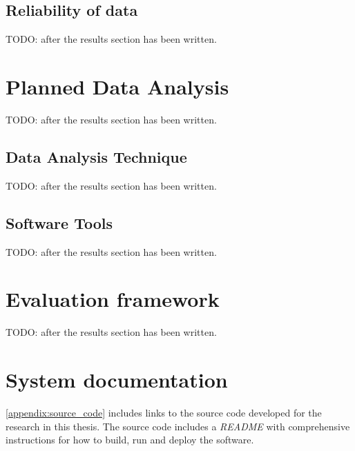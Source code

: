 \subsection{Reliability of data}
\label{sec:reliabilityOfData}






TODO: after the results section has been written.


\section{Planned Data Analysis}
\label{sec:plannedDataAnalysis}




TODO: after the results section has been written.


\subsection{Data Analysis Technique}
\label{sec:dataAnalysisTechnique}


TODO: after the results section has been written.


\subsection{Software Tools}
\label{sec:softwareTools}


TODO: after the results section has been written.


\section{Evaluation framework}
\label{sec:evaluationFramework}


TODO: after the results section has been written.




\section{System documentation}
\label{sec:systemDocumentation}




\autoref{appendix:source_code} includes links to the source code developed for the research in this thesis. The source code includes a \textit{README} with comprehensive instructions for how to build, run and deploy the software.




\cleardoublepage
